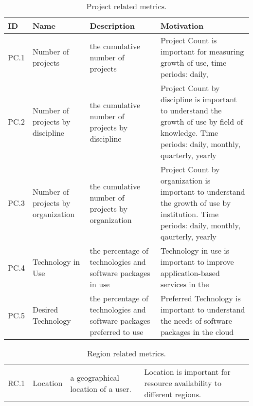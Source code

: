 \begin{table*}[P]
\caption{Project related metrics.}
\begin{scriptsize}
\label{T:metrics}
\bigskip
\begin{center}
\begin{tabular}{lp{}p{}p{}}
\hline
\rowcolor{blue!20} ID & Name & Description & Motivation \\
\hline 
PC.1 & Number of projects & 
the cumulative number of projects & 
Project Count is important for measuring growth of use, time periods:
                                    daily, \\
\hline
PC.2 & Number of projects by discipline & 
the cumulative number of projects by discipline &
Project Count by discipline is important to understand the growth of use by
field of knowledge.  Time periods: daily, monthly, quarterly, yearly \\
\hline
PC.3 & Number of projects by organization & 
the cumulative number of projects by organization &
Project Count by organization is important to understand the growth of use by
institution. Time periods: daily, monthly, qaurterly, yearly \\
\hline
PC.4 & Technology in Use & 
the percentage of technologies and software packages in use & 
Technology in use is important to improve application-based services
                                                              in the \\
\hline
PC.5 & Desired Technology &  
the percentage of technologies and software packages preferred to use &
Preferred Technology is important to understand the needs of software packages
in the cloud \\
\hline
\end{tabular}
\end{center}
\end{scriptsize}
\end{table*}

\begin{table*}[P]
\caption{Region related metrics.}
\begin{scriptsize}
\label{T:metrics}
\bigskip
\begin{center}
\begin{tabular}{lp{}p{}p{}}
\hline
RC.1 & 
Location & 
a geographical location of a user. & 
Location is important for resource availability to different regions. \\
\end{tabular}
\end{center}
\end{scriptsize}
\end{table*}


\clearpage